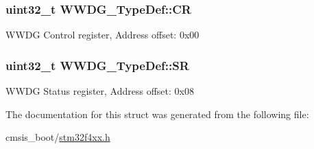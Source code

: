 \subsubsection[{\texorpdfstring{CR}{CR}}]{ uint32\+\_\+t W\+W\+D\+G\+\_\+\+Type\+Def\+::\+CR}\hypertarget{struct_w_w_d_g___type_def_a4caf530d45f7428c9700d9c0057135f8}{}\label{struct_w_w_d_g___type_def_a4caf530d45f7428c9700d9c0057135f8}
W\+W\+DG Control register, Address offset\+: 0x00 
\subsubsection[{\texorpdfstring{SR}{SR}}]{ uint32\+\_\+t W\+W\+D\+G\+\_\+\+Type\+Def\+::\+SR}\hypertarget{struct_w_w_d_g___type_def_a15655cda4854cc794db1f27b3c0bba38}{}\label{struct_w_w_d_g___type_def_a15655cda4854cc794db1f27b3c0bba38}
W\+W\+DG Status register, Address offset\+: 0x08 

The documentation for this struct was generated from the following file\+:\begin{DoxyCompactItemize}
\item 
cmsis\+\_\+boot/\hyperlink{stm32f4xx_8h}{stm32f4xx.\+h}\end{DoxyCompactItemize}
